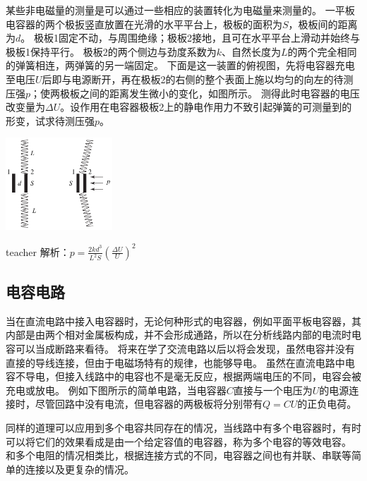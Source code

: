 \begin{example}
某些非电磁量的测量是可以通过一些相应的装置转化为电磁量来测量的。
一平板电容器的两个极扳竖直放置在光滑的水平平台上，极板的面积为$S$，极板间的距离为$d$。
极板1固定不动，与周围绝缘；极板2接地，且可在水平平台上滑动并始终与极板1保持平行。
极板2的两个侧边与劲度系数为$k$、自然长度为$L$的两个完全相同的弹簧相连，两弹簧的另一端固定。
下面是这一装置的俯视图，先将电容器充电至电压$U$后即与电源断开，再在极板2的右侧的整个表面上施以均匀的向左的待测压强$p$；使两极板之间的距离发生微小的变化，如图所示。
测得此时电容器的电压改变量为$\Delta U$。设作用在电容器极板2上的静电作用力不致引起弹簧的可测量到的形变，试求待测压强$p$。
\begin{flushright}
\includegraphics[width = 0.3\textwidth]{images/elec-problem-19.pdf} 
\end{flushright}

\begin{taggedblock}{teacher}
\noindent
解析：$p=\frac{2kd^3}{L^2S}(\frac{\Delta U}{U})^2$
\end{taggedblock}
\end{example}


\subsection{电容电路}
当在直流电路中接入电容器时，无论何种形式的电容器，例如平面平板电容器，其内部是由两个相对金属板构成，并不会形成通路，所以在分析线路内部的电流时电容可以当成断路来看待。
将来在学了交流电路以后以将会发现，虽然电容并没有直接的导线连接，但由于电磁场特有的规律，也能够导电。
虽然在直流电路中电容不导电，但接入线路中的电容也不是毫无反应，根据两端电压的不同，电容会被充电或放电。
例如下图所示的简单电路，当电容器$C$直接与一个电压为$U$的电源连接时，尽管回路中没有电流，但电容器的两极板将分别带有$Q=CU$的正负电荷。

同样的道理可以应用到多个电容共同存在的情况，当线路中有多个电容器时，有时可以将它们的效果看成是由一个给定容值的电容器，称为多个电容的等效电容。
和多个电阻的情况相类比，根据连接方式的不同，电容器之间也有并联、串联等简单的连接以及更复杂的情况。

